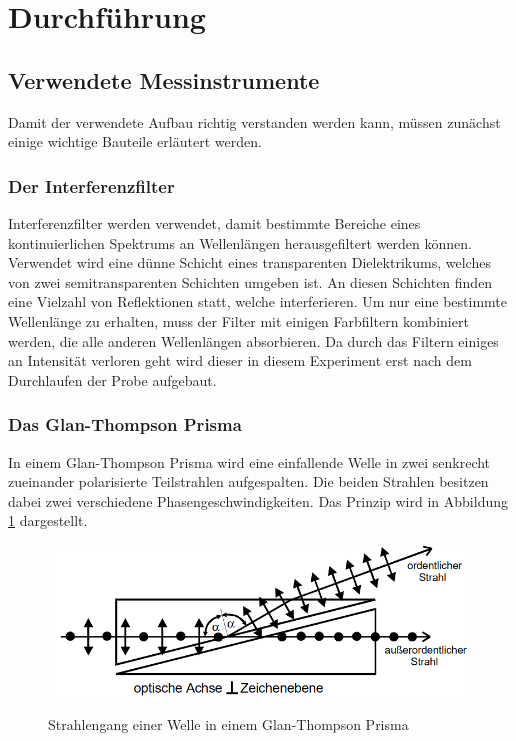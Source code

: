 \section{Durchführung}
\subsection{Verwendete Messinstrumente}
Damit der verwendete Aufbau richtig verstanden werden kann, müssen zunächst
einige wichtige Bauteile erläutert werden.
\subsubsection{Der Interferenzfilter}
Interferenzfilter werden verwendet, damit bestimmte Bereiche eines
kontinuierlichen Spektrums an Wellenlängen herausgefiltert werden können.
Verwendet wird eine dünne Schicht eines transparenten Dielektrikums, welches
von zwei semitransparenten Schichten umgeben ist. An diesen Schichten finden
eine Vielzahl von Reflektionen statt, welche interferieren. Um nur eine bestimmte
Wellenlänge zu erhalten, muss der Filter mit einigen Farbfiltern kombiniert
werden, die alle anderen Wellenlängen absorbieren. Da durch das Filtern einiges
an Intensität verloren geht wird dieser in diesem Experiment erst nach dem
Durchlaufen der Probe aufgebaut.

\subsubsection{Das Glan-Thompson Prisma}
In einem Glan-Thompson Prisma wird eine einfallende Welle in zwei senkrecht
zueinander polarisierte Teilstrahlen aufgespalten. Die beiden Strahlen
besitzen dabei zwei verschiedene Phasengeschwindigkeiten. Das Prinzip wird in
Abbildung \ref{fig:glan} dargestellt.

\begin{figure}[H]
  \centering
  \includegraphics[width=12cm, height=4cm]{glanthom.png}
  \caption{Strahlengang einer Welle in einem Glan-Thompson Prisma}
  \label{fig:glan}
  \cite{skript}
\end{figure}

